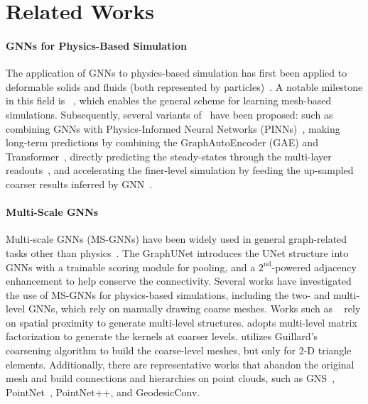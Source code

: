 \section{Related Works}
\label{sec:related}
\paragraph*{GNNs for Physics-Based Simulation}
The application of GNNs to physics-based simulation has first been applied to deformable solids and fluids (both represented by particles)~\cite{sanchez2018graph}. A notable milestone in this field is \flatGNN~\cite{pfaff2020learning}, which enables the general scheme for learning mesh-based simulations. Subsequently, several variants of \flatGNN~have been proposed: such as combining GNNs with Physics-Informed Neural Networks (PINNs)~\cite{gao2022physics}, making long-term predictions by combining the GraphAutoEncoder (GAE) and Transformer~\cite{han2022predicting}, directly predicting the steady-states through the multi-layer readouts~\cite{harsch2021direct}, and accelerating the finer-level simulation by feeding the up-sampled coarser results inferred by GNN~\cite{belbute2020combining}.

\paragraph*{Multi-Scale GNNs}
Multi-scale GNNs (MS-GNNs) have been widely used in general graph-related tasks other than physics~\cite{wu2020comprehensive,mesquita2020rethinking,zhang2019hierarchical}. The GraphUNet\cite{gao2019graph} introduces the UNet structure into GNNs with a trainable scoring module for pooling, and a $2^{\text{nd}}$-powered adjacency enhancement to help conserve the connectivity. Several works have investigated the use of MS-GNNs for physics-based simulations, including the two- and multi-level GNNs\cite{fortunato2022multiscale,liu2021multi}, which rely on manually drawing coarse meshes. Works such as \linoGNN~\cite{lino2021simulating,lino2022towards} rely on spatial proximity to generate multi-level structures. \citet{li2020multipole} adopts multi-level matrix factorization to generate the kernels at coarser levels. \citet{lino2022multi} utilizes Guillard’s coarsening algorithm to build the coarse-level meshes, but only for 2-D triangle elements. Additionally, there are representative works that abandon the original mesh and build connections and hierarchies on point clouds, such as GNS~\cite{sanchez2020learning}, PointNet~\cite{qi2017pointnet}, PointNet++\cite{qi2017pointnet++}, and GeodesicConv\cite{masci2015geodesic}.
